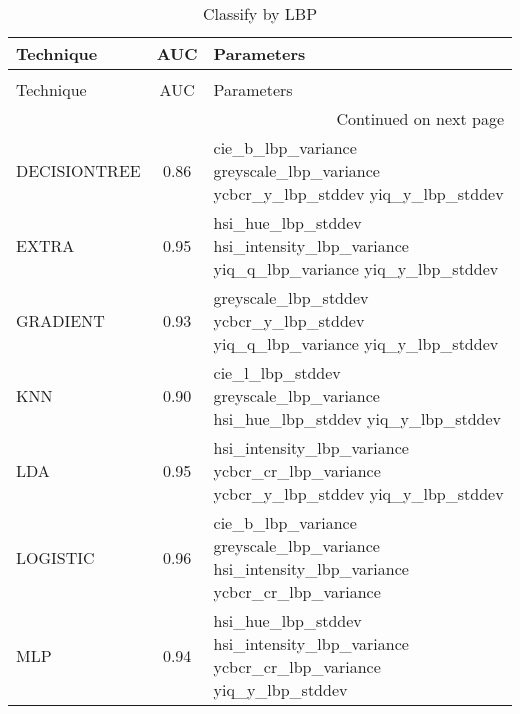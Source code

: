 \begin{longtable}{lcl}
\caption[Classify by LBP]{Classify by LBP}
\label{table:results-lbp}\\
\toprule
   Technique &  AUC &                                                                                 Parameters \\
\midrule
\endfirsthead
\caption[]{Classify by LBP} \\
\toprule
   Technique &  AUC &                                                                                 Parameters \\
\midrule
\endhead
\midrule
\multicolumn{3}{r}{{Continued on next page}} \\
\midrule
\endfoot

\bottomrule
\endlastfoot
DECISIONTREE & 0.86 & \begin{minipage}[t]{0.5\textwidth} cie\_b\_lbp\_variance greyscale\_lbp\_variance ycbcr\_y\_lbp\_stddev yiq\_y\_lbp\_stddev  \end{minipage}\\
\midrule
EXTRA & 0.95 & \begin{minipage}[t]{0.5\textwidth} hsi\_hue\_lbp\_stddev hsi\_intensity\_lbp\_variance yiq\_q\_lbp\_variance yiq\_y\_lbp\_stddev  \end{minipage}\\
\midrule
GRADIENT & 0.93 &\begin{minipage}[t]{0.5\textwidth} greyscale\_lbp\_stddev ycbcr\_y\_lbp\_stddev yiq\_q\_lbp\_variance yiq\_y\_lbp\_stddev  \end{minipage}\\
\midrule
KNN & 0.90 & \begin{minipage}[t]{0.5\textwidth} cie\_l\_lbp\_stddev greyscale\_lbp\_variance hsi\_hue\_lbp\_stddev yiq\_y\_lbp\_stddev  \end{minipage}\\
\midrule
LDA & 0.95 &  \begin{minipage}[t]{0.5\textwidth} hsi\_intensity\_lbp\_variance ycbcr\_cr\_lbp\_variance ycbcr\_y\_lbp\_stddev yiq\_y\_lbp\_stddev  \end{minipage} \\
\midrule
LOGISTIC & 0.96 & \begin{minipage}[t]{0.5\textwidth}cie\_b\_lbp\_variance greyscale\_lbp\_variance hsi\_intensity\_lbp\_variance ycbcr\_cr\_lbp\_variance  \end{minipage}\\
\midrule
MLP & 0.94 & \begin{minipage}[t]{0.5\textwidth} hsi\_hue\_lbp\_stddev hsi\_intensity\_lbp\_variance ycbcr\_cr\_lbp\_variance yiq\_y\_lbp\_stddev  \end{minipage} \\

\end{longtable}
